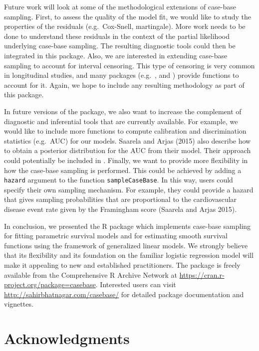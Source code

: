 Future work will look at some of the methodological extensions of case-base sampling. First, to assess the quality of the model fit, we would like to study the properties of the residuals (e.g.~Cox-Snell, martingale). More work needs to be done to understand these residuals in the context of the partial likelihood underlying case-base sampling. The resulting diagnostic tools could then be integrated in this package. Also, we are interested in extending case-base sampling to account for interval censoring. This type of censoring is very common in longitudinal studies, and many packages (e.g.~,  and ) provide functions to account for it. Again, we hope to include any resulting methodology as part of this package.

In future versions of the package, we also want to increase the complement of diagnostic and inferential tools that are currently available. For example, we would like to include more functions to compute calibration and discrimination statistics (e.g.~AUC) for our models. Saarela and Arjas (2015) also describe how to obtain a posterior distribution for the AUC from their model. Their approach could potentially be included in . Finally, we want to provide more flexibility in how the case-base sampling is performed. This could be achieved by adding a \texttt{hazard} argument to the function \texttt{sampleCaseBase}. In this way, users could specify their own sampling mechanism. For example, they could provide a hazard that gives sampling probabilities that are proportional to the cardiovascular disease event rate given by the Framingham score (Saarela and Arjas 2015).

In conclusion, we presented the R package  which implements case-base sampling for fitting parametric survival models and for estimating smooth survival functions using the framework of generalized linear models. We strongly believe that its flexibility and its foundation on the familiar logistic regression model will make it appealing to new and established practitioners. The  package is freely available from the Comprehensive R Archive Network at \url{https://cran.r-project.org/package=casebase}. Interested users can visit \url{http://sahirbhatnagar.com/casebase/} for detailed package documentation and vignettes.

\hypertarget{acknowledgments}{%
\section{Acknowledgments}\label{acknowledgments}}

